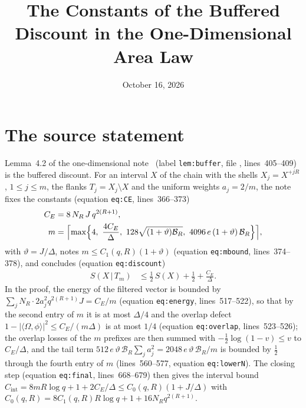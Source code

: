 \documentclass{article}
\title{The Constants of the Buffered Discount in the One-Dimensional Area Law}
\author{}
\date{October 16, 2026}
\begin{document}
\maketitle
{}

\section{The source statement}

Lemma~4.2 of the one-dimensional note~\cite{TNLean2026OneDimensional}
(label \texttt{lem:buffer}, file , lines~405--409)
is the buffered discount. For an interval $X$ of the chain with the shells
$X_j=X^{+jR}$, $1\le j\le m$, the flanks $T_j=X_j\setminus X$ and the uniform
weights $a_j=2/m$, the note fixes the constants (equation \texttt{eq:CE},
lines~366--373)
\begin{align}
    C_E
     & = 8\,N_R\,J\,q^{2(R+1)},
    \label{eq:tnlean_one_dimensional_discount_constants_source_energy_constant}                \\
    m
     & = \Bigl\lceil\max\Bigl\{4,\ \frac{4C_E}{\Delta},\ 128\sqrt{(1+\vartheta)\mathcal B_R},\
    4096\,e\,(1+\vartheta)\,\mathcal B_R\Bigr\}\Bigr\rceil,
    \label{eq:tnlean_one_dimensional_discount_constants_source_shell_count}
\end{align}
with $\vartheta=J/\Delta$, notes $m\le C_1(q,R)(1+\vartheta)$
(equation \texttt{eq:mbound}, lines~374--378), and concludes
(equation \texttt{eq:discount})
\begin{align}
    S(X\,|\,T_m)
     & \le \tfrac12\,S(X)+\tfrac12+\frac{C_E}{\Delta}.
    \label{eq:tnlean_one_dimensional_discount_constants_source_discount}
\end{align}
In the proof, the energy of the filtered vector is bounded by
$\sum_j N_R\cdot 2a_j^2q^{2(R+1)}J=C_E/m$ (equation \texttt{eq:energy},
lines~517--522), so that by the second entry of $m$ it is at most $\Delta/4$
and the overlap defect $1-|\langle\Omega,\phi\rangle|^2\le C_E/(m\Delta)$ is
at most $1/4$ (equation \texttt{eq:overlap}, lines~523--526); the overlap
losses of the $m$ prefixes are then summed with $-\frac12\log(1-v)\le v$ to
$C_E/\Delta$, and the tail term
$512\,e\,\vartheta\,\mathcal B_R\sum_ja_j^2=2048\,e\,\vartheta\,\mathcal B_R/m$
is bounded by $\frac12$ through the fourth entry of $m$ (lines~560--577,
equation \texttt{eq:lowerN}). The closing step (equation \texttt{eq:final},
lines~668--679) then gives the interval bound
$C_{\mathrm{int}}=8mR\log q+1+2C_E/\Delta\le C_0(q,R)(1+J/\Delta)$ with
$C_0(q,R)=8C_1(q,R)R\log q+1+16N_Rq^{2(R+1)}$.
\end{document}
